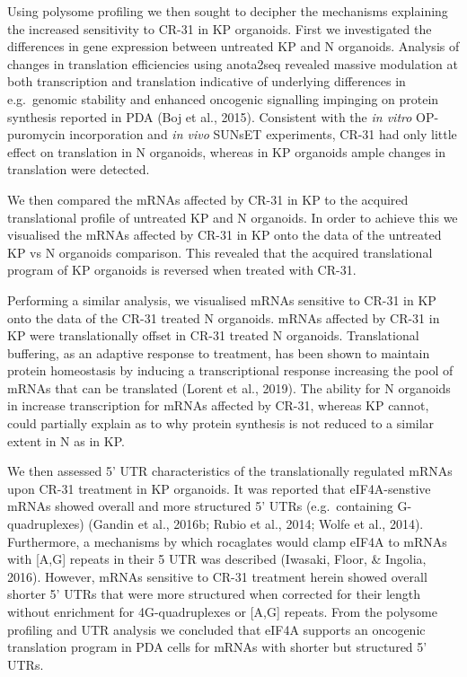 \documentclass[12pt,openany]{book}
\begin{document}
Using polysome profiling we then sought to decipher the mechanisms
explaining the increased sensitivity to CR-31 in KP organoids. First we
investigated the differences in gene expression between untreated KP and
N organoids. Analysis of changes in translation efficiencies using
anota2seq revealed massive modulation at both transcription and
translation indicative of underlying differences in e.g.~genomic
stability and enhanced oncogenic signalling impinging on protein
synthesis reported in PDA (Boj et al., 2015). Consistent with the
\emph{in vitro} OP-puromycin incorporation and \emph{in vivo} SUNsET
experiments, CR-31 had only little effect on translation in N organoids,
whereas in KP organoids ample changes in translation were detected.

We then compared the mRNAs affected by CR-31 in KP to the acquired
translational profile of untreated KP and N organoids. In order to
achieve this we visualised the mRNAs affected by CR-31 in KP onto the
data of the untreated KP vs N organoids comparison. This revealed that
the acquired translational program of KP organoids is reversed when
treated with CR-31.

Performing a similar analysis, we visualised mRNAs sensitive to CR-31 in
KP onto the data of the CR-31 treated N organoids. mRNAs affected by
CR-31 in KP were translationally offset in CR-31 treated N organoids.
Translational buffering, as an adaptive response to treatment, has been
shown to maintain protein homeostasis by inducing a transcriptional
response increasing the pool of mRNAs that can be translated (Lorent et
al., 2019). The ability for N organoids in increase transcription for
mRNAs affected by CR-31, whereas KP cannot, could partially explain as
to why protein synthesis is not reduced to a similar extent in N as in
KP.

We then assessed 5' UTR characteristics of the translationally regulated
mRNAs upon CR-31 treatment in KP organoids. It was reported that
eIF4A-senstive mRNAs showed overall and more structured 5' UTRs
(e.g.~containing G-quadruplexes) (Gandin et al., 2016b; Rubio et al.,
2014; Wolfe et al., 2014). Furthermore, a mechanisms by which rocaglates
would clamp eIF4A to mRNAs with {[}A,G{]} repeats in their 5 UTR was
described (Iwasaki, Floor, \& Ingolia, 2016). However, mRNAs sensitive
to CR-31 treatment herein showed overall shorter 5' UTRs that were more
structured when corrected for their length without enrichment for
4G-quadruplexes or {[}A,G{]} repeats. From the polysome profiling and
UTR analysis we concluded that eIF4A supports an oncogenic translation
program in PDA cells for mRNAs with shorter but structured 5' UTRs.
\end{document}

